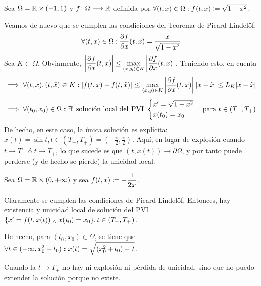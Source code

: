 \begin{ejem}
	Sea $\Omega = \mathbb{R} \times (-1,1)$ y $f \colon \Omega \longrightarrow \mathbb{R}$ definida por $\forall (t,x) \in \Omega : f(t,x)\vcentcolon= \sqrt{1-x^2} $.

	Veamos de nuevo que se cumplen las condiciones del Teorema de Picard-Lindelöf: \[\forall (t,x) \in \Omega : \pdv{f}{x}(t,x)=\frac{x}{\sqrt{1-x^2}}\]
	Sea $K \subset \Omega$. Obviamente, $\displaystyle \left |\frac{\partial f }{\partial x}(t,x) \right | \leq \displaystyle \max_{(x,y)\in K} \left |\frac{\partial f }{\partial x}(t,x) \right |$.
	Teniendo esto, en cuenta
	\[\implies \forall (t,x) , (t,\Tilde{x}) \in K : |f(t,x)-f(t,\Tilde{x})| \leq \max_{(x,y)\in K} \left |\frac{\partial f }{\partial x}(t,x) \right | |x-\Tilde{x}| \leq L_K |x-\Tilde{x}| \]
	\[\implies \forall (t_0,x_0)\in \Omega : \exists ! \text{ solución local del PVI } \begin{cases}x'=\sqrt{1-x^2} \\ x(t_0)=x_0 \end{cases}\text{para } t \in (T_-,T_+)\]
	De hecho, en este caso, la única solución es explícita: $x(t)=\sin t, t \in (T_-,T_+)=\left ( - \frac{\pi}{2}, \frac{\pi}{2} \right )$.
	Aquí, en lugar de explosión cuando $t \to T_-$ ó $t \to T_+$, lo que sucede es que $(t,x(t)) \to \partial \Omega$, y por tanto puede perderse (y de hecho se pierde) la unicidad local.
\end{ejem}

\begin{ejem}
	Sea $\Omega = \mathbb{R} \times (0, + \infty)$ y sea $\displaystyle f(t,x) \vcentcolon= - \frac{1}{2x}$.

	Claramente se cumplen las condiciones de Picard-Lindelöf. Entonces, hay existencia y unicidad local de solución del PVI $\{ x'=f(t,x(t)) \; _{\wedge} \; x(t_0)=x_0 \}, t \in (T_-,T_+)$.

	De hecho, para $(t_0,x_0)\in \Omega$, se tiene que $\displaystyle \forall t \in (-\infty , x_0^2 + t_0) : x(t)=\sqrt{(x_0^2+t_0)-t}$.

	Cuando la $t \to T_+$ no hay ni explosión ni pérdida de unicidad, sino que no puedo extender la solución porque no existe.
\end{ejem}

